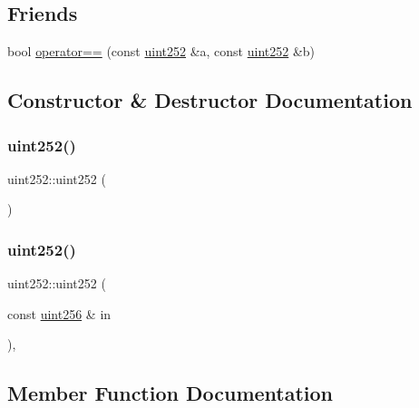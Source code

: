 \subsection*{Friends}
\begin{DoxyCompactItemize}
\item 
bool \mbox{\hyperlink{classuint252_a4fbc20c56fe58943428d789f1495dbbd}{operator==}} (const \mbox{\hyperlink{classuint252}{uint252}} \&a, const \mbox{\hyperlink{classuint252}{uint252}} \&b)
\end{DoxyCompactItemize}


\subsection{Constructor \& Destructor Documentation}
\mbox{\label{classuint252_a1c1e7b58c526400f4f4a49d8583c3362}} 
\subsubsection{\texorpdfstring{uint252()}{uint252()}\hspace{0.1cm}{\footnotesize\ttfamily [1/2]}}
{\footnotesize\ttfamily uint252\+::uint252 (\begin{DoxyParamCaption}{ }\end{DoxyParamCaption})\hspace{0.3cm}{\ttfamily [inline]}}

\mbox{\label{classuint252_a7ea8b4bf97422fbd8900270f4f2f24cb}} 
\subsubsection{\texorpdfstring{uint252()}{uint252()}\hspace{0.1cm}{\footnotesize\ttfamily [2/2]}}
{\footnotesize\ttfamily uint252\+::uint252 (\begin{DoxyParamCaption}\item[{const \mbox{\hyperlink{classuint256}{uint256}} \&}]{in }\end{DoxyParamCaption})\hspace{0.3cm}{\ttfamily [inline]}, {\ttfamily [explicit]}}



\subsection{Member Function Documentation}
\mbox{\label{classuint252_aecef4074b301a7274b2190d77333aa8e}} 
